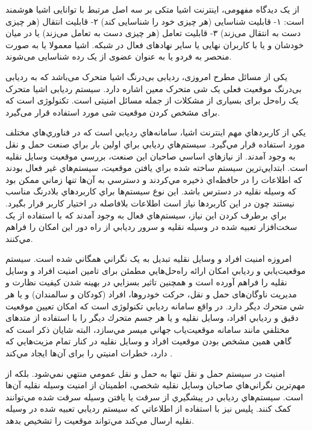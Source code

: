 از یک دیدگاه مفهومی، اینترنت اشیا متکی بر سه اصل مرتبط با توانایی اشیا هوشمند است:
 ۱- قابلیت شناسایی (هر چیزی خود را شناسایی کند) ۲- قابلیت انتقال (هر چیزی دست به انتقال می‌زند) ۳- قابلیت تعامل (هر چیزی دست به تعامل می‌زند) یا در میان خودشان و یا با کاربران نهایی یا سایر نهادهای فعال در شبکه. اشیا معمولا یا به صورت منحصر به فردو یا به عنوان عضوی از یک رده شناسایی می‌شوند.


یکی از مسائل مطرح امروزی، ردیابی بی‌درنگ اشیا متحرک می‌باشد که به ردیابی بی‌درنگ موقعیت فعلی یک شی متحرک معین اشاره دارد. 
سیستم ردیابی اشیا متحرک یک راه‌حل برای بسیاری از مشکلات از جمله مسائل امنیتی است. تکنولوژی است که برای مشخص کردن موقعیت شی مورد استفاده قرار می‌گیرد.


يكي از كاربردهاي مهم اينترنت اشيا، سامانه‌هاي رديابي است كه در فناوري‌هاي مختلف مورد استفاده قرار مي‌گیرد. سيستم‌هاي رديابي براي اولين بار براي صنعت حمل و نقل به وجود آمدند. از نيازهاي اساسي صاحبان اين صنعت، بررسي موقعيت وسايل نقليه است. ابتدايي‌ترين سيستم‌ ساخته شده براي يافتن موقعيت، سيستم‌هاي غير فعال بودند كه اطلاعات را در حافظه‌اي ذخیره مي‌كردند و دسترسي به آن‌ها تنها زماني ممكن بود كه وسيله نقليه در دسترس باشد. اين نوع سيستم‌ها براي كاربردهاي بلادرنگ مناسب نيستند چون در اين كاربردها نياز است اطلاعات بلافاصله در اختيار كاربر قرار بگيرد. براي برطرف كردن اين نياز، سيستم‌هاي فعال به وجود آمدند كه با استفاده از يک سخت‌افزار تعبيه شده در وسيله نقليه و سرور رديابي از راه دور اين امكان را فراهم مي‌كنند.


امروزه امنيت افراد و وسايل نقليه تبديل به يک نگراني همگاني شده است. سيستم موقعيت‌يابي و رديابي امکان ارائه راه‌حل‌هايي مطمئن برای تامين امنيت افراد و وسايل نقليه را فراهم آورده است و همچنين تاثير بسزايي در بهينه شدن كيفيت نظارت و مديريت ناوگان‌های حمل و نقل، حركت خودروها، افراد (کودکان و سالمندان) و يا هر شي متحرك ديگر دارد. در واقع سامانه رديابي تکنولوژی است كه امکان تعيين موقعيت دقيق و رديابي افراد، وسايل نقليه و يا هر جسم متحرك ديگر را با استفاده از متدهای مختلفي مانند سامانه موقعيت‌‌یاب جهاني  ميسر مي‌سازد، البته شايان ذكر است كه گاهي همين مشخص بودن موقعيت افراد و وسايل نقليه در كنار تمام مزيت‌هايي كه دارد، خطرات امنيتي را برای آن‌ها ايجاد مي‌كند \cite{Rahman2016}.


امنيت در سيستم حمل و نقل تنها به حمل و نقل عمومي منتهي نمي‌شود. بلكه از مهم‌ترین نگراني‌هاي صاحبان وسايل نقليه شخصي، اطمينان از امنيت وسيله نقليه آن‌ها است. سيستم‌هاي رديابي در پيشگيري از سرقت يا یافتن وسيله سرقت شده مي‌توانند كمک كنند. پلیس نيز با استفاده از اطلاعاتي كه سيستم رديابي تعبیه شده در وسيله نقليه ارسال مي‌كند مي‌تواند موقعيت را تشخيص بدهد.


